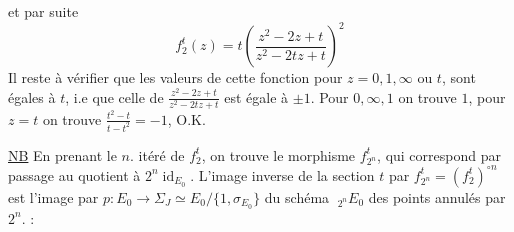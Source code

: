 et par suite
\[
 f_2^t(z)=t\left(\frac{z^2-2z+t}{z^2-2tz+t}\right)^2
 \tag*{(37)}
\]
Il reste à vérifier que les valeurs de cette fonction pour $z=0,1,\infty$ ou $t$, sont égales à $t$, i.e que celle de $\frac{z^2-2z+t}{z^2-2tz+t}$ est égale à $\pm1$. Pour $0,\infty,1$ on trouve $1$, pour $z=t$ on trouve $\frac{t^2-t}{t-t^2}=-1$, O.K.

\uline{NB} En prenant le $n$. itéré de $f_2^t$, on trouve le morphisme $f_{2^n}^t$, qui correspond par passage au quotient à $2^n\operatorname{id}_{E_0}$. L'image inverse de la section $t$ par $f_{2^n}^t=(f_2^t)^{\circ n}$ est l'image par $p:E_0\longrightarrow\Sigma_J\simeq E_0/\{1,\sigma_{E_0}\}$ du  schéma  $\;{}_{2^n}E_0$ des points annulés par $2^n$.
:
